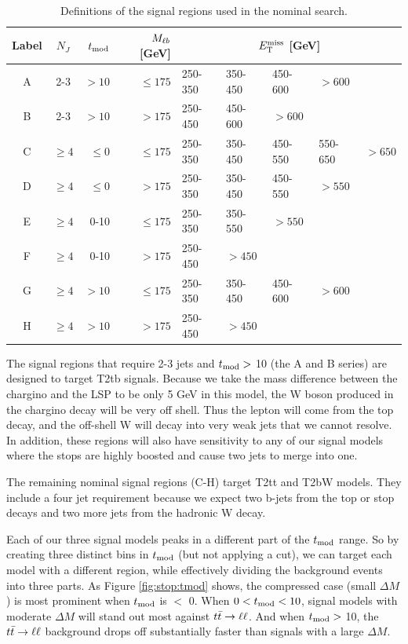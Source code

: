\begin{table}[htb]
\centering
\caption{Definitions of the signal regions used in the nominal search.}
\label{tab:stop:nominalsrs}
\begin{tabular}{|c|c|r|r|lllll|}
\hline
Label & $N_J$ & $t_\text{mod}$ & $M_{\ell b}$ [GeV] & \multicolumn{5}{c|}{$E_\text{T}^\text{miss}$ [GeV]} \\
\hline
A & 2-3     & $>10$ & $\leq175$     & 250-350 & 350-450 & 450-600 & $>600$ & \\
B & 2-3     & $>10$ & $>175$        & 250-450 & 450-600 & $>600$ & & \\
C & $\geq4$ & $\leq0$ & $\leq175$   & 250-350 & 350-450 & 450-550 & 550-650 & $>650$ \\
D & $\geq4$ & $\leq0$ & $>175$      & 250-350 & 350-450 & 450-550 & $>550$ & \\
E & $\geq4$ & 0-10 & $\leq175$      & 250-350 & 350-550 & $>550$ & & \\
F & $\geq4$ & 0-10 & $>175$         & 250-450 & $>450$ & & & \\
G & $\geq4$ & $>10$ & $\leq175$     & 250-350 & 350-450 & 450-600 & $>600$ & \\
H & $\geq4$ & $>10$ & $>175$        & 250-450 & $>450$ & & & \\
\hline
\end{tabular}
\end{table}

The signal regions that require 2-3 jets and $t_\text{mod} >$ 10
(the A and B series) are
designed to target T2tb signals. Because we take the mass difference
between the chargino and the LSP to be only 5 GeV in this model, the
W boson produced in the chargino decay will be very off
shell. Thus the lepton will come from the top decay, and the off-shell
W will decay into very weak jets that we cannot resolve. In addition,
these regions will also have sensitivity to any of our signal models
where the stops are highly boosted and cause two jets to merge into one.

The remaining nominal signal regions (C-H) target T2tt and T2bW
models. They include a four jet requirement because we expect two b-jets from the
top or stop decays and two more jets from the hadronic W decay.

Each of our three signal models peaks in a different part of the
$t_\text{mod}$ range. So by creating three distinct bins in
$t_\text{mod}$ (but not applying a cut), we can target each model with
a different region, while effectively dividing the background events into three
parts. As Figure \ref{fig:stop:tmod} shows, the compressed
case (small $\Delta M$) is most prominent when
$t_\text{mod}$ is $<$ 0. When $0 < t_\text{mod} < 10$, signal models
with moderate $\Delta M$ will stand out most against
$t\bar{t} \rightarrow \ell\ell$. And when $t_\text{mod} >$ 10, the $t\bar{t} \rightarrow \ell\ell$ background
drops off substantially faster than signals with a large $\Delta M$.


